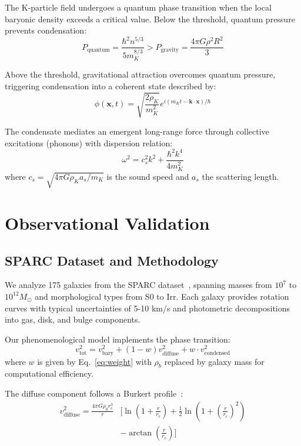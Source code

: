 \documentclass[aps,prd,twocolumn,showpacs,superscriptaddress,groupedaddress,nofootinbib]{revtex4-2}
\begin{document}
The K-particle field undergoes a quantum phase transition when the local baryonic density exceeds a critical value. Below the threshold, quantum pressure prevents condensation:
\begin{equation}
P_{\text{quantum}} = \frac{\hbar^2 n^{5/3}}{5m_K^{8/3}} > P_{\text{gravity}} = \frac{4\pi G \rho^2 R^2}{3}
\end{equation}

Above the threshold, gravitational attraction overcomes quantum pressure, triggering condensation into a coherent state described by:
\begin{equation}
\phi(\mathbf{x},t) = \sqrt{\frac{2\rho_K}{m_K^2}}e^{i(m_K t - \mathbf{k}\cdot\mathbf{x})/\hbar}
\end{equation}

The condensate mediates an emergent long-range force through collective excitations (phonons) with dispersion relation:
\begin{equation}
\omega^2 = c_s^2 k^2 + \frac{\hbar^2 k^4}{4m_K^2}
\end{equation}
where $c_s = \sqrt{4\pi G\rho_K a_s/m_K}$ is the sound speed and $a_s$ the scattering length.

\section{Observational Validation}

\subsection{SPARC Dataset and Methodology}

We analyze 175 galaxies from the SPARC dataset~\cite{Lelli2016}, spanning masses from $10^7$ to $10^{12} M_{\odot}$ and morphological types from S0 to Irr. Each galaxy provides rotation curves with typical uncertainties of 5-10 km/s and photometric decompositions into gas, disk, and bulge components.

Our phenomenological model implements the phase transition:
\begin{equation}
v^2_{\text{tot}} = v^2_{\text{bary}} + (1-w)v^2_{\text{diffuse}} + w \cdot v^2_{\text{condensed}}
\label{eq:model}
\end{equation}
where $w$ is given by Eq.~\ref{eq:weight} with $\rho_b$ replaced by galaxy mass for computational efficiency.

The diffuse component follows a Burkert profile~\cite{Burkert1995,Salucci2000}:
\begin{align}
v^2_{\text{diffuse}} = \frac{4\pi G \rho_0 r_c^3}{r}&\Bigg[\ln\left(1+\frac{r}{r_c}\right) + \frac{1}{2}\ln\left(1+\left(\frac{r}{r_c}\right)^2\right) \nonumber \\
&- \arctan\left(\frac{r}{r_c}\right)\Bigg]
\end{align}
\end{document}
